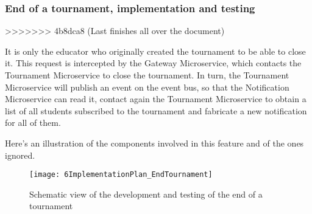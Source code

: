 \subsubsection*{End of a tournament, implementation and testing}
>>>>>>> 4b8dca8 (Last finishes all over the document)

It is only the educator who originally created the tournament to be able to close it. This request is intercepted by the Gateway Microservice, which contacts the Tournament Microservice to close the tournament. 
In turn, the Tournament Microservice will publish an event on the event bus, so that the Notification Microservice can read it, contact again the Tournament Microservice to obtain a list of all students subscribed to the tournament and fabricate a new notification for all of them.

Here's an illustration of the components involved in this feature and of the ones ignored.

\begin{figure}[h]
        \centering
	\texttt{[image: 6ImplementationPlan\_EndTournament]}
        \caption{Schematic view of the development and testing of the end of a tournament}
\end{figure}

\newpage
